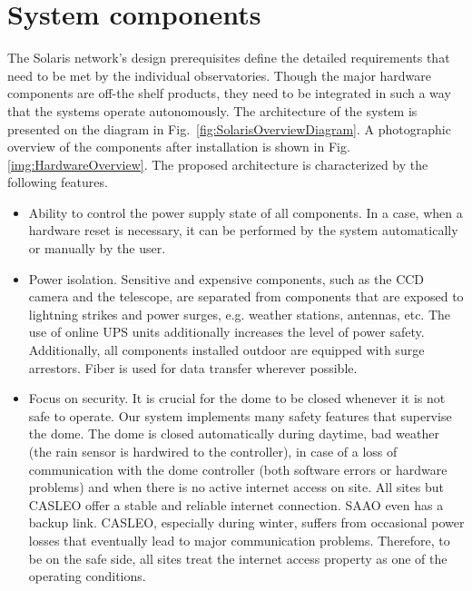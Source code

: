 
\section{System components}

\label{sec:HardwareComponents}

The Solaris network's design prerequisites define the detailed requirements that need to be met by the individual observatories. Though the major hardware components are off-the shelf products, they need to be integrated in such a way that the systems operate autonomously. The architecture of the system is presented on the diagram in Fig.~\ref{fig:SolarisOverviewDiagram}. A photographic overview of the components after installation is shown in Fig. \ref{img:HardwareOverview}. The proposed architecture is characterized by the following features.

\begin{itemize}
\item Ability to control the power supply state of all components. In a case, when a hardware reset is necessary, it can be performed by the system automatically or manually by the user. 
\item Power isolation. Sensitive and expensive components, such as the CCD camera and the telescope, are separated from components that are exposed to lightning strikes and power surges, e.g. weather stations, antennas, etc. The use of online UPS units additionally increases the level of power safety. Additionally, all components installed outdoor are equipped with surge arrestors. Fiber is used for data transfer wherever possible.
\item Focus on security. It is crucial for the dome to be closed whenever it is not safe to operate. Our system implements many safety features that supervise the dome. The dome is closed automatically during daytime, bad weather (the rain sensor is hardwired to the controller), in case of a loss of communication with the dome controller (both software errors or hardware problems) and when there is no active internet access on site. All sites but CASLEO offer a stable and reliable internet connection. SAAO even has a backup link. CASLEO, especially during winter, suffers from occasional power losses that eventually lead to major communication problems. Therefore, to be on the safe side, all sites treat the internet access property as one of the operating conditions.
\end{itemize}

